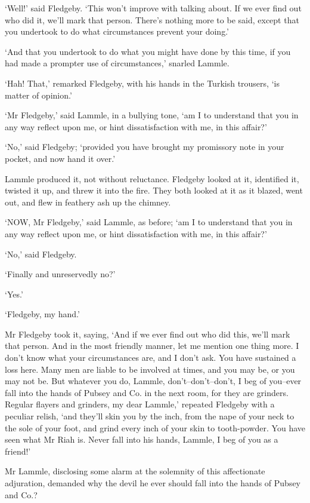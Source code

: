 ‘Well!’ said Fledgeby. ‘This won’t improve with talking about. If we
ever find out who did it, we’ll mark that person. There’s nothing more
to be said, except that you undertook to do what circumstances prevent
your doing.’

‘And that you undertook to do what you might have done by this time, if
you had made a prompter use of circumstances,’ snarled Lammle.

‘Hah! That,’ remarked Fledgeby, with his hands in the Turkish trousers,
‘is matter of opinion.’

‘Mr Fledgeby,’ said Lammle, in a bullying tone, ‘am I to understand that
you in any way reflect upon me, or hint dissatisfaction with me, in this
affair?’

‘No,’ said Fledgeby; ‘provided you have brought my promissory note in
your pocket, and now hand it over.’

Lammle produced it, not without reluctance. Fledgeby looked at it,
identified it, twisted it up, and threw it into the fire. They both
looked at it as it blazed, went out, and flew in feathery ash up the
chimney.

‘NOW, Mr Fledgeby,’ said Lammle, as before; ‘am I to understand that
you in any way reflect upon me, or hint dissatisfaction with me, in this
affair?’

‘No,’ said Fledgeby.

‘Finally and unreservedly no?’

‘Yes.’

‘Fledgeby, my hand.’

Mr Fledgeby took it, saying, ‘And if we ever find out who did this,
we’ll mark that person. And in the most friendly manner, let me mention
one thing more. I don’t know what your circumstances are, and I don’t
ask. You have sustained a loss here. Many men are liable to be involved
at times, and you may be, or you may not be. But whatever you do,
Lammle, don’t--don’t--don’t, I beg of you--ever fall into the hands of
Pubsey and Co. in the next room, for they are grinders. Regular flayers
and grinders, my dear Lammle,’ repeated Fledgeby with a peculiar relish,
‘and they’ll skin you by the inch, from the nape of your neck to the
sole of your foot, and grind every inch of your skin to tooth-powder.
You have seen what Mr Riah is. Never fall into his hands, Lammle, I beg
of you as a friend!’

Mr Lammle, disclosing some alarm at the solemnity of this affectionate
adjuration, demanded why the devil he ever should fall into the hands of
Pubsey and Co.?

